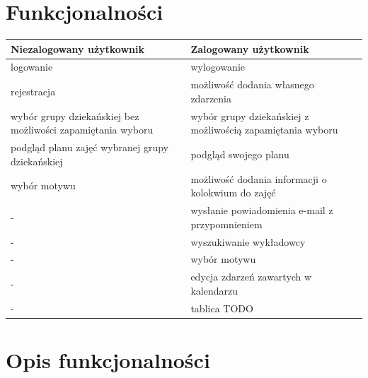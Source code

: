 \documentclass[a4paper,11pt]{uzreport}
\begin{document}
\clearpage
\section{Funkcjonalności}

\begin{center}
\begin{tabular}{ |m{8cm} | m{8cm} | } 
\hline
\textbf{Niezalogowany użytkownik} 									& \textbf{Zalogowany użytkownik}						\\
\hline
logowanie	 													&wylogowanie										\\ 
\hline
rejestracja														&możliwość dodania własnego zdarzenia					\\ 
\hline
wybór grupy dziekańskiej bez możliwości zapamiętania wyboru				&wybór grupy dziekańskiej z możliwością zapamiętania wyboru	\\ 
\hline
podgląd planu zajęć wybranej grupy dziekańskiej							&podgląd swojego planu								\\ 
\hline
wybór motywu													&możliwość dodania informacji o kolokwium do zajęć			\\ 
\hline
-															&wysłanie powiadomienia e-mail z przypomnieniem			\\ 
\hline
-															&wyszukiwanie wykładowcy							\\ 
\hline
-															&wybór motywu										\\ 
\hline
-															&edycja zdarzeń zawartych w kalendarzu					\\ 
\hline
-															& tablica TODO										\\ 
\hline
\end{tabular}
\end{center}
    
\section{Opis funkcjonalności}
    
\end{document}
